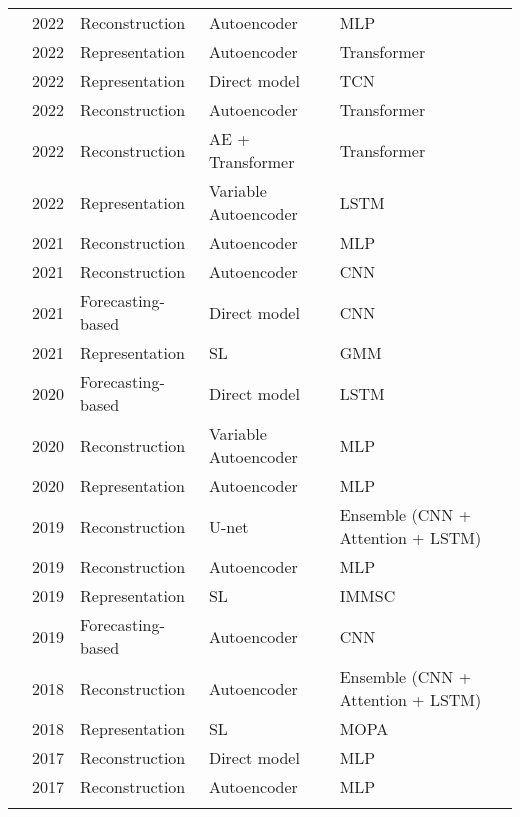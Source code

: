 \begin{landscape}
\begin{longtable}{lllll}
\begin{tabular}{lllll}
\cite{gargEvaluationAnomalyDetection2022} & 2022 & Reconstruction & Autoencoder & MLP \\
\cite{chiBearingFaultDiagnosis2022} & 2022 & Representation & Autoencoder & Transformer \\
\cite{neupaneTemporalAnomalyDetection2022} & 2022 & Representation & Direct model & TCN \\
\cite{tuliTranADDeepTransformer2022} & 2022 & Reconstruction & Autoencoder & Transformer \\
\cite{xuAnomalyTransformerTime2022} & 2022 & Reconstruction & AE + Transformer & Transformer \\
\cite{velasco-gallegoRADISRealtimeAnomaly2022} & 2022 & Representation & Variable Autoencoder & LSTM \\
\cite{arellano-espitiaDeepCompactClusteringBasedAnomaly2021} & 2021 & Reconstruction & Autoencoder & MLP \\
\cite{thillTemporalConvolutionalAutoencoder2021} & 2021 & Reconstruction & Autoencoder & CNN \\
\cite{liuDeepAnomalyDetection2021} & 2021 & Forecasting-based & Direct model & CNN \\
\cite{huNovelVehicleGearbox2021} & 2021 & Representation & SL & GMM \\
\cite{minghuzhangDataDrivenAnomalyDetection2020} & 2020 & Forecasting-based & Direct model & LSTM \\
\cite{ellefsenOnlineFaultDetection2020} & 2020 & Reconstruction & Variable Autoencoder & MLP \\
\cite{kimSemiSupervisedAutoencoderAuxiliary2020} & 2020 & Representation & Autoencoder & MLP \\
\cite{zhangDeepNeuralNetwork2019} & 2019 & Reconstruction & U-net & Ensemble (CNN + Attention + LSTM) \\
\cite{zhangDynamicConditionMonitoring2019} & 2019 & Reconstruction & Autoencoder & MLP \\
\cite{songUnsupervisedFaultDiagnosis2019} & 2019 & Representation & SL & IMMSC \\
\cite{munirFuseADUnsupervisedAnomaly2019} & 2019 & Forecasting-based & Autoencoder & CNN \\
\cite{zhangDeepNeuralNetwork2018} & 2018 & Reconstruction & Autoencoder & Ensemble (CNN + Attention + LSTM) \\
\cite{helsenFleetwideConditionMonitoring2018} & 2018 & Representation & SL & MOPA \\
\cite{shipmonTimeSeriesAnomaly2017} & 2017 & Reconstruction & Direct model & MLP \\
\cite{zhouAnomalyDetectionRobust2017} & 2017 & Reconstruction & Autoencoder & MLP \\
\bottomrule
\end{tabular}

\end{longtable}
\end{landscape}
